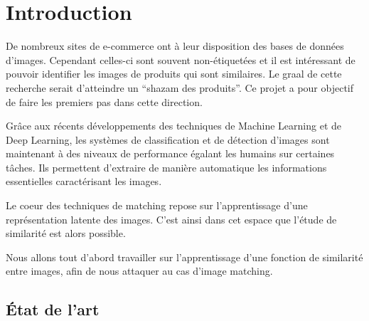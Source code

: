 \section*{Introduction}

De nombreux sites de e-commerce ont à leur disposition des bases de données d’images. Cependant celles-ci sont souvent
non-étiquetées et il est intéressant de pouvoir identifier les images de produits qui sont similaires. Le graal de cette
recherche serait d’atteindre un “shazam des produits”. Ce projet a pour objectif de faire les premiers pas dans cette
direction. 

Grâce aux récents développements des techniques de Machine Learning et de Deep Learning, les systèmes de classification
et de détection d’images sont maintenant à des niveaux de performance égalant les humains sur certaines tâches. Ils
permettent d’extraire de manière automatique les informations essentielles caractérisant les images.

Le coeur des techniques de matching repose sur l’apprentissage d’une représentation latente des images. C’est ainsi dans
cet espace que l’étude de similarité est alors possible.

Nous allons tout d'abord travailler sur l'apprentissage d'une fonction de similarité entre images, afin de nous attaquer
au cas d'image matching.

\subsection{État de l'art}



